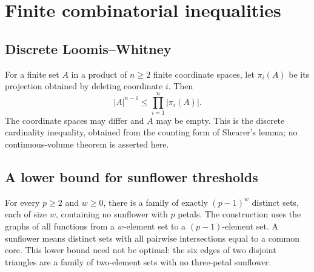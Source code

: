 \section{Finite combinatorial inequalities}

\begin{result}
\subsection{Discrete Loomis--Whitney}
For a finite set $A$ in a product of $n\ge2$ finite coordinate spaces, let
$\pi_i(A)$ be its projection obtained by deleting coordinate $i$. Then
\[
|A|^{n-1}\le\prod_{i=1}^n|\pi_i(A)|.
\]
The coordinate spaces may differ and $A$ may be empty. This is the discrete
cardinality inequality, obtained from the counting form of Shearer's lemma;
no continuous-volume theorem is asserted here.
\citep{LoomisWhitney1949,ChungGrahamFranklShearer1986}
\end{result}

\begin{result}
\subsection{A lower bound for sunflower thresholds}
For every $p\ge2$ and $w\ge0$, there is a family of exactly $(p-1)^w$
distinct sets, each of size $w$, containing no sunflower with $p$ petals.
The construction uses the graphs of all functions from a $w$-element set to
a $(p-1)$-element set. A sunflower means distinct sets with all pairwise
intersections equal to a common core.
This lower bound need not be optimal: the six edges of two disjoint triangles
are a family of two-element sets with no three-petal sunflower.
\citep{ErdosRado1960}
\end{result}
